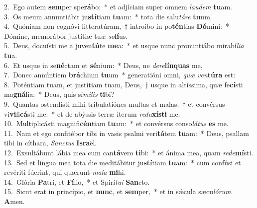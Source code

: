 {2.~}Ego autem \textbf{sem}per spe\textbf{rá}bo:~* et adjíciam super omnem \textit{lau}\textit{dem} \textbf{tu}am.\\
{3.~}Os meum annuntiábit ju\textbf{stí}tiam \textbf{tu}am:~* tota die salu\textit{tá}\textit{re} \textbf{tu}um.\\
{4.~}Quóniam non cognóvi litteratúram,~† introíbo in po\textbf{tén}tias \textbf{Dó}mini:~* Dómine, memorábor justítiæ tu\textit{æ} \textit{so}\textbf{lí}us.\\
{5.~}Deus, docuísti me a juven\textbf{tú}te \textbf{me}a:~* et usque nunc pronuntiábo mirabí\textit{li}\textit{a} \textbf{tu}a.\\
{6.~}Et usque in se\textbf{né}ctam et \textbf{sé}nium:~* Deus, ne \textit{de}\textit{re}\textbf{lín}\textbf{quas} me,\\
{7.~}Donec annúntiem \textbf{brá}chium \textbf{tu}um~* generatióni omni, \textit{quæ} \textit{ven}\textbf{tú}\textbf{ra} est:\\
{8.~}Poténtiam tuam, et justítiam tuam, Deus,~† usque in altíssima, quæ fe\textbf{cí}sti ma\textbf{gná}lia:~* Deus, quis sí\textit{mi}\textit{lis} \textbf{ti}bi?\\
{9.~}Quantas ostendísti mihi tribulatiónes multas et malas:~† et convérsus vi\textbf{vi}fi\textbf{cá}sti me:~* et de abýssis terræ íterum \textit{re}\textit{du}\textbf{xí}\textbf{sti} me:\\
{10.~}Multiplicásti magnifi\textbf{cén}tiam \textbf{tu}am:~* et convérsus conso\textit{lá}\textit{tus} \textbf{es} me.\\
{11.~}Nam et ego confitébor tibi in vasis psalmi veri\textbf{tá}tem \textbf{tu}am:~* Deus, psallam tibi in cíthara, \textit{San}\textit{ctus} \textbf{Is}\textbf{ra}ël.\\
{12.~}Exsultábunt lábia mea cum can\textbf{tá}vero \textbf{ti}bi:~* et ánima mea, quam \textit{re}\textit{de}\textbf{mí}sti.\\
{13.~}Sed et lingua mea tota die meditábitur ju\textbf{stí}tiam \textbf{tu}am:~* cum confúsi et revériti fúerint, qui quærunt \textit{ma}\textit{la} \textbf{mi}hi.\\
{14.~}Glória \textbf{Pa}tri, et \textbf{Fí}lio,~* et Spirí\textit{tu}\textit{i} \textbf{San}cto.\\
{15.~}Sicut erat in princípio, et \textbf{nunc}, et \textbf{sem}per,~* et in sǽcula sæcu\textit{ló}\textit{rum}. \textbf{A}men.\\
